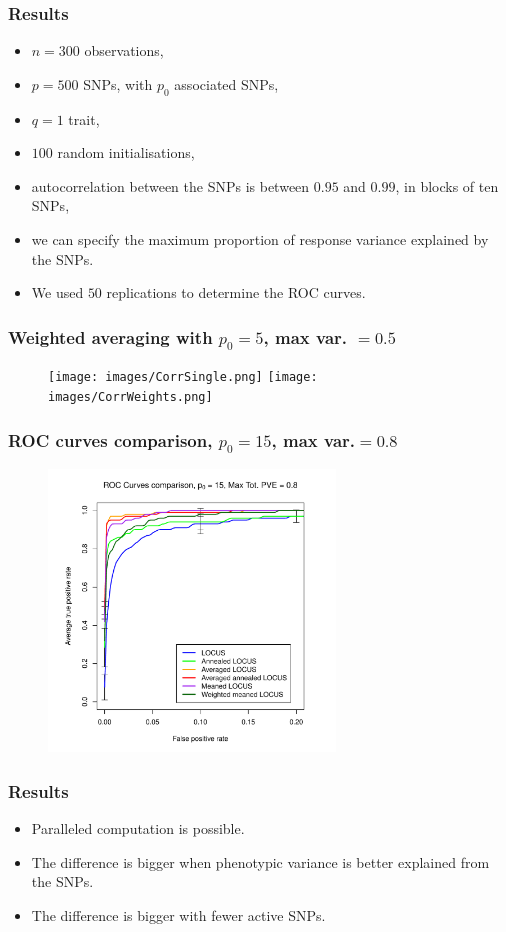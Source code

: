 \documentclass{beamer}
\begin{document}
\begin{frame}
\frametitle{Results}
\begin{itemize}
\item $n = 300$ observations,
\item $p = 500$ SNPs, with $p_0$ associated SNPs,
\item $q = 1$ trait, %
\item $100$ random initialisations,
\item autocorrelation between the SNPs is between $0.95$ and $0.99$, in blocks of ten SNPs,
\item we can specify the maximum proportion of response variance explained by the SNPs.
\item We used $50$ replications to determine the ROC curves.
\end{itemize}
\end{frame}

\begin{frame}
\frametitle{Weighted averaging with $p_0 = 5$, max var. $=0.5$}
\begin{figure}
\texttt{[image: images/CorrSingle.png]}
\texttt{[image: images/CorrWeights.png]}
\end{figure}
\end{frame}


\begin{frame}
\frametitle{ROC curves comparison, $p_0 = 15$, max var.$=0.8$}
\begin{figure}
\includegraphics[width=3in]{images/ROC_curves.pdf}
\end{figure}
\end{frame}


\begin{frame}
\frametitle{Results}
\begin{itemize}
\item Paralleled computation is possible.
\item The difference is bigger when phenotypic variance is better explained from the SNPs.
\item The difference is bigger with fewer active SNPs.
\end{itemize}
\end{frame}
\end{document}
